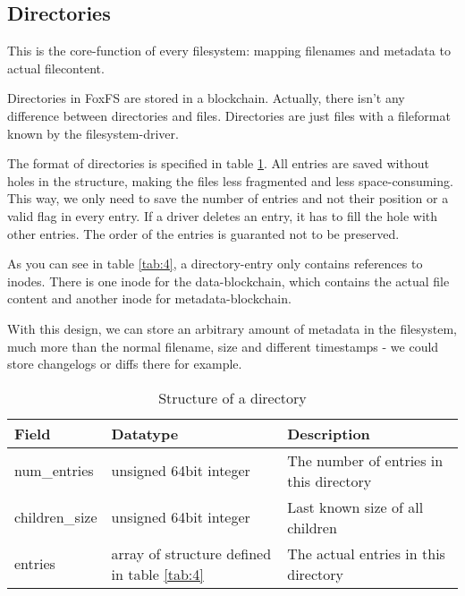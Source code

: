 \documentclass[a4paper,12pt]{article}
\begin{document}
		\subsection{Directories}
			This is the core-function of every filesystem: mapping filenames and metadata to actual filecontent.
			
			Directories in FoxFS are stored in a blockchain. Actually, there isn't any difference between directories and files. Directories are just files with a fileformat known by the filesystem-driver.
			
			The format of directories is specified in table \ref{tab:3}. All entries are saved without holes in the structure, making the files less fragmented and less space-consuming. This way, we only need to save the number of entries and not their position or a valid flag in every entry. If a driver deletes an entry, it has to fill the hole with other entries. The order of the entries is guaranted not to be preserved.			
			
			As you can see in table \ref{tab:4}, a directory-entry only contains references to inodes. There is one inode for the data-blockchain, which contains the actual file content and another inode for metadata-blockchain.
			
			With this design, we can store an arbitrary amount of metadata in the filesystem, much more than the normal filename, size and different timestamps - we could store changelogs or diffs there for example.
			
			\begin{table}[ht]
				\caption{Structure of a directory}\label{tab:3}
				\begin{tabularx}{\linewidth}{|l|l|X|} \hline
					\textbf{Field}		& \textbf{Datatype}								& \textbf{Description} \\ \hline
					num\_entries		& unsigned 64bit integer						& The number of entries in this directory \\ \hline
					children\_size		& unsigned 64bit integer						& Last known size of all children \\ \hline
					entries				& array of structure defined in table \ref{tab:4}	& The actual entries in this directory \\ \hline
				\end{tabularx}
			\end{table}
		
\end{document}
